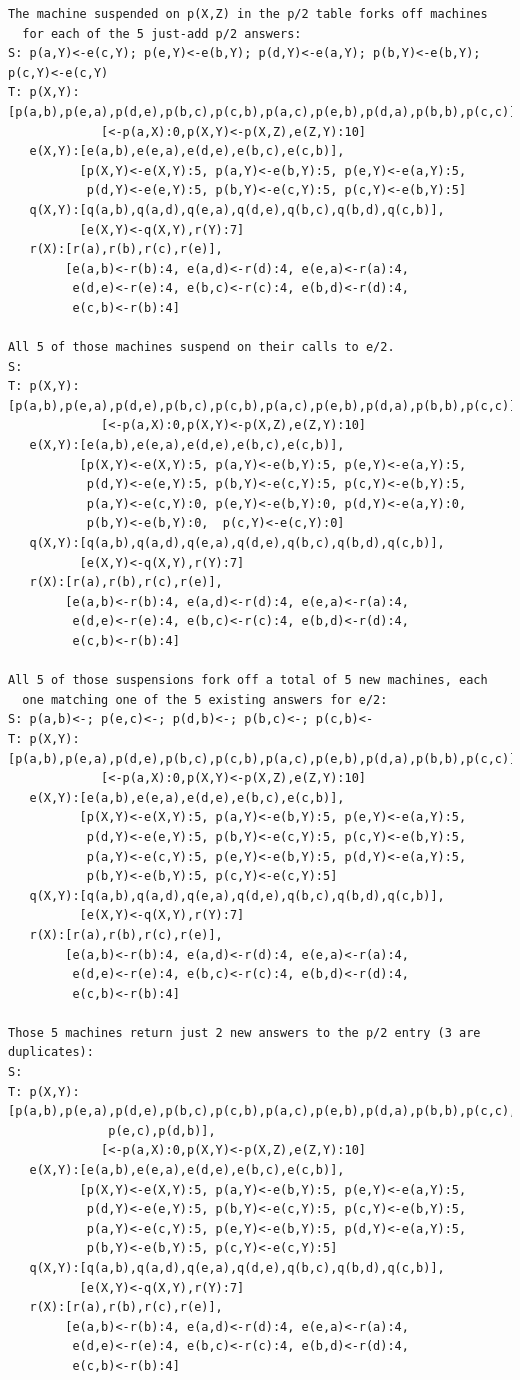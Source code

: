 \begin{verbatim}
The machine suspended on p(X,Z) in the p/2 table forks off machines
  for each of the 5 just-add p/2 answers:
S: p(a,Y)<-e(c,Y); p(e,Y)<-e(b,Y); p(d,Y)<-e(a,Y); p(b,Y)<-e(b,Y); p(c,Y)<-e(c,Y)
T: p(X,Y):[p(a,b),p(e,a),p(d,e),p(b,c),p(c,b),p(a,c),p(e,b),p(d,a),p(b,b),p(c,c)],
             [<-p(a,X):0,p(X,Y)<-p(X,Z),e(Z,Y):10]
   e(X,Y):[e(a,b),e(e,a),e(d,e),e(b,c),e(c,b)],
          [p(X,Y)<-e(X,Y):5, p(a,Y)<-e(b,Y):5, p(e,Y)<-e(a,Y):5,
           p(d,Y)<-e(e,Y):5, p(b,Y)<-e(c,Y):5, p(c,Y)<-e(b,Y):5]
   q(X,Y):[q(a,b),q(a,d),q(e,a),q(d,e),q(b,c),q(b,d),q(c,b)],
          [e(X,Y)<-q(X,Y),r(Y):7]
   r(X):[r(a),r(b),r(c),r(e)],
        [e(a,b)<-r(b):4, e(a,d)<-r(d):4, e(e,a)<-r(a):4,
         e(d,e)<-r(e):4, e(b,c)<-r(c):4, e(b,d)<-r(d):4,
         e(c,b)<-r(b):4]

All 5 of those machines suspend on their calls to e/2.
S: 
T: p(X,Y):[p(a,b),p(e,a),p(d,e),p(b,c),p(c,b),p(a,c),p(e,b),p(d,a),p(b,b),p(c,c)],
             [<-p(a,X):0,p(X,Y)<-p(X,Z),e(Z,Y):10]
   e(X,Y):[e(a,b),e(e,a),e(d,e),e(b,c),e(c,b)],
          [p(X,Y)<-e(X,Y):5, p(a,Y)<-e(b,Y):5, p(e,Y)<-e(a,Y):5,
           p(d,Y)<-e(e,Y):5, p(b,Y)<-e(c,Y):5, p(c,Y)<-e(b,Y):5,
           p(a,Y)<-e(c,Y):0, p(e,Y)<-e(b,Y):0, p(d,Y)<-e(a,Y):0,
           p(b,Y)<-e(b,Y):0,  p(c,Y)<-e(c,Y):0]
   q(X,Y):[q(a,b),q(a,d),q(e,a),q(d,e),q(b,c),q(b,d),q(c,b)],
          [e(X,Y)<-q(X,Y),r(Y):7]
   r(X):[r(a),r(b),r(c),r(e)],
        [e(a,b)<-r(b):4, e(a,d)<-r(d):4, e(e,a)<-r(a):4,
         e(d,e)<-r(e):4, e(b,c)<-r(c):4, e(b,d)<-r(d):4,
         e(c,b)<-r(b):4]

All 5 of those suspensions fork off a total of 5 new machines, each
  one matching one of the 5 existing answers for e/2:
S: p(a,b)<-; p(e,c)<-; p(d,b)<-; p(b,c)<-; p(c,b)<-       
T: p(X,Y):[p(a,b),p(e,a),p(d,e),p(b,c),p(c,b),p(a,c),p(e,b),p(d,a),p(b,b),p(c,c)],
             [<-p(a,X):0,p(X,Y)<-p(X,Z),e(Z,Y):10]
   e(X,Y):[e(a,b),e(e,a),e(d,e),e(b,c),e(c,b)],
          [p(X,Y)<-e(X,Y):5, p(a,Y)<-e(b,Y):5, p(e,Y)<-e(a,Y):5,
           p(d,Y)<-e(e,Y):5, p(b,Y)<-e(c,Y):5, p(c,Y)<-e(b,Y):5,
           p(a,Y)<-e(c,Y):5, p(e,Y)<-e(b,Y):5, p(d,Y)<-e(a,Y):5,
           p(b,Y)<-e(b,Y):5, p(c,Y)<-e(c,Y):5]
   q(X,Y):[q(a,b),q(a,d),q(e,a),q(d,e),q(b,c),q(b,d),q(c,b)],
          [e(X,Y)<-q(X,Y),r(Y):7]
   r(X):[r(a),r(b),r(c),r(e)],
        [e(a,b)<-r(b):4, e(a,d)<-r(d):4, e(e,a)<-r(a):4,
         e(d,e)<-r(e):4, e(b,c)<-r(c):4, e(b,d)<-r(d):4,
         e(c,b)<-r(b):4]

Those 5 machines return just 2 new answers to the p/2 entry (3 are duplicates):
S:
T: p(X,Y):[p(a,b),p(e,a),p(d,e),p(b,c),p(c,b),p(a,c),p(e,b),p(d,a),p(b,b),p(c,c),
              p(e,c),p(d,b)],
             [<-p(a,X):0,p(X,Y)<-p(X,Z),e(Z,Y):10]
   e(X,Y):[e(a,b),e(e,a),e(d,e),e(b,c),e(c,b)],
          [p(X,Y)<-e(X,Y):5, p(a,Y)<-e(b,Y):5, p(e,Y)<-e(a,Y):5,
           p(d,Y)<-e(e,Y):5, p(b,Y)<-e(c,Y):5, p(c,Y)<-e(b,Y):5,
           p(a,Y)<-e(c,Y):5, p(e,Y)<-e(b,Y):5, p(d,Y)<-e(a,Y):5,
           p(b,Y)<-e(b,Y):5, p(c,Y)<-e(c,Y):5]
   q(X,Y):[q(a,b),q(a,d),q(e,a),q(d,e),q(b,c),q(b,d),q(c,b)],
          [e(X,Y)<-q(X,Y),r(Y):7]
   r(X):[r(a),r(b),r(c),r(e)],
        [e(a,b)<-r(b):4, e(a,d)<-r(d):4, e(e,a)<-r(a):4,
         e(d,e)<-r(e):4, e(b,c)<-r(c):4, e(b,d)<-r(d):4,
         e(c,b)<-r(b):4]


\end{verbatim}
